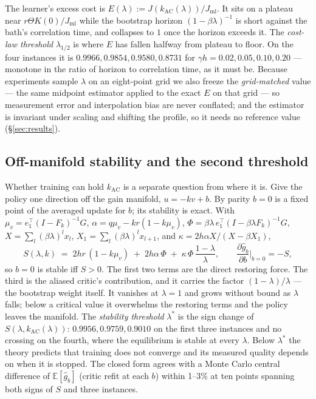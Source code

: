 The learner's excess cost is $E(\lambda) := J(k_{\mathrm{AC}}(\lambda))/J_{\mathrm{ml}}$.
It sits on a plateau near $r\Theta K(0)/J_{\mathrm{ml}}$ while the bootstrap
horizon $(1-\beta\lambda)^{-1}$ is short against the bath's correlation time,
and collapses to $1$ once the horizon exceeds it. The \emph{cost-law threshold}
$\lambda_{1/2}$ is where $E$ has fallen halfway from plateau to floor. On the
four instances it is $0.9966, 0.9854, 0.9580, 0.8731$ for
$\gamma h = 0.02, 0.05, 0.10, 0.20$ --- monotone in the ratio of horizon to
correlation time, as it must be. Because experiments sample $\lambda$ on an
eight-point grid we also freeze the \emph{grid-matched} value --- the same
midpoint estimator applied to the exact $E$ on that grid --- so measurement
error and interpolation bias are never conflated; and the estimator is
invariant under scaling and shifting the profile, so it needs no reference
value (\S\ref{sec:results}).

\subsection{Off-manifold stability and the second threshold}

Whether training can hold $k_{\mathrm{AC}}$ is a separate question from where
it is. Give the policy one direction off the gain manifold, $u = -kv + b$. By
parity $b=0$ is a fixed point of the averaged update for $b$; its stability is
exact. With $\mu_v = e_1^\top(I - F_k)^{-1}G$,
$\alpha = q\mu_v - kr(1 - k\mu_v)$,
$\Phi = \beta\lambda\, e_1^\top (I - \beta\lambda F_k)^{-1} G$,
$X = \sum_l (\beta\lambda)^l x_l$, $X_1 = \sum_l (\beta\lambda)^l x_{l+1}$, and
$\kappa = 2h\alpha X/(X - \beta X_1)$,
\begin{equation}
S(\lambda,k) \;=\; 2hr\,(1 - k\mu_v) \;+\; 2h\alpha\,\Phi \;+\; \kappa\,\Phi\,\frac{1-\lambda}{\lambda},
\qquad
\frac{\partial \hat g_b}{\partial b}\Big|_{b=0} = -S,
\label{eq:S}
\end{equation}
so $b=0$ is stable iff $S>0$. The first two terms are the direct restoring
force. The third is the aliased critic's contribution, and it carries the
factor $(1-\lambda)/\lambda$ --- the bootstrap weight itself. It vanishes at
$\lambda=1$ and grows without bound as $\lambda$ falls; below a critical value
it overwhelms the restoring terms and the policy leaves the manifold. The
\emph{stability threshold} $\lambda^\ast$ is the sign change of
$S(\lambda, k_{\mathrm{AC}}(\lambda))$: $0.9956, 0.9759, 0.9010$ on the first
three instances and no crossing on the fourth, where the equilibrium is stable
at every $\lambda$. Below $\lambda^\ast$ the theory predicts that training does
not converge and its measured quality depends on when it is stopped. The closed form agrees with a Monte Carlo central difference of
$\mathbb{E}[\hat g_b]$ (critic refit at each $b$) within 1--3\% at ten points
spanning both signs of $S$ and three instances.

